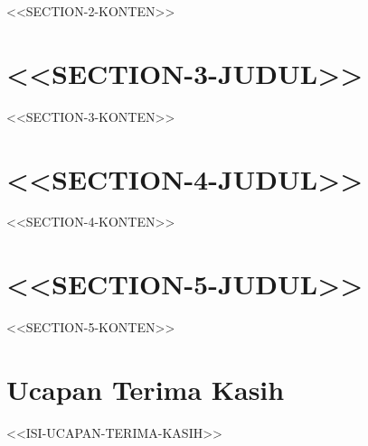 \documentclass[preprint,12pt]{elsarticle}
\begin{document}
<<SECTION-2-KONTEN>>

\section{<<SECTION-3-JUDUL>>}

<<SECTION-3-KONTEN>>

\section{<<SECTION-4-JUDUL>>}

<<SECTION-4-KONTEN>>

\section{<<SECTION-5-JUDUL>>}

<<SECTION-5-KONTEN>>

\section*{Ucapan Terima Kasih}

<<ISI-UCAPAN-TERIMA-KASIH>>



\end{document}

